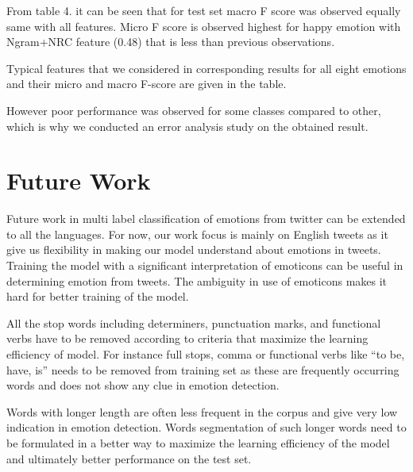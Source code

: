 \documentclass[11pt]{article}
\begin{document}
  From table 4. it can be seen that for test set  macro F score was observed equally same with all features. Micro F score is observed highest for happy emotion with Ngram+NRC feature (0.48) that is less than previous observations.
  
  
   
  
  
  
  Typical features that we considered in corresponding results for all eight
  emotions and their micro and macro F-score are given in the table.
  
  However poor performance was observed for some classes compared to other, which is why we conducted an error analysis study on the obtained result.
  
  
  \section{Future Work}
  
  Future work in multi label classification of emotions from twitter can be extended to all the languages. For now, our work focus is mainly on
  English tweets as it give us flexibility in making our model understand about emotions in tweets. Training the model with a significant interpretation
  of emoticons can be useful in determining emotion from tweets. The ambiguity in use of emoticons makes it hard for better training of the model.
  
  
  All the stop words including determiners, punctuation marks, and functional verbs have to be removed according to criteria that maximize the learning efficiency of model. For instance full stops, comma or functional verbs like “to be, have,
  is” needs to be removed from training set as these are frequently occurring words and does not show any clue in emotion detection.
  
  
  Words with longer length are often less frequent in the corpus and give very low indication in emotion detection. Words segmentation of such longer
  words need to be formulated in a better way to maximize the learning efficiency of the model and ultimately better performance on the test set.
  
  
  
\end{document}
